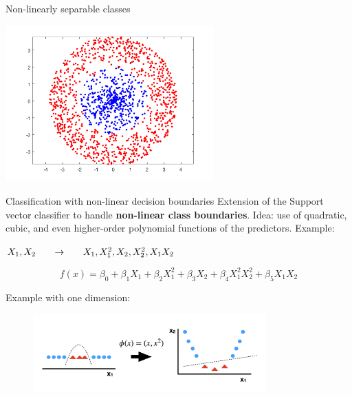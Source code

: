 \documentclass[notes]{beamer}          %
\begin{document}
\begin{frame}{Non-linearly separable classes}
\begin{center}
\includegraphics[height=6cm]{../figures/week_2_classification/nonseparableclass.png}  
\end{center}


\end{frame}

\begin{frame}{Classification with non-linear decision boundaries}
Extension of the Support vector classifier to handle \textbf{non-linear class boundaries}. 
Idea: use of quadratic, cubic, and even higher-order polynomial functions of the predictors.
Example:
\begin{center}{
$X_1, X_2 \hspace{0.05\textwidth}\to\hspace{0.05\textwidth} X_1, X^2_1, X_2, X^2_2, X_1X_2$}
\end{center}
\begin{equation*}
	f(x)=\beta_0 + \beta_1X_1 + \beta_2X^2_1 + \beta_3X_2 + 		\beta_4X^2_1X^2_2+ \beta_5X_1X_2 
\end{equation*}

Example with one dimension:
\begin{figure}
  \includegraphics[width=0.8\textwidth]{../figures/week_2_classification/SVM_kernel}  
\end{figure}


\end{frame}
\end{document}
